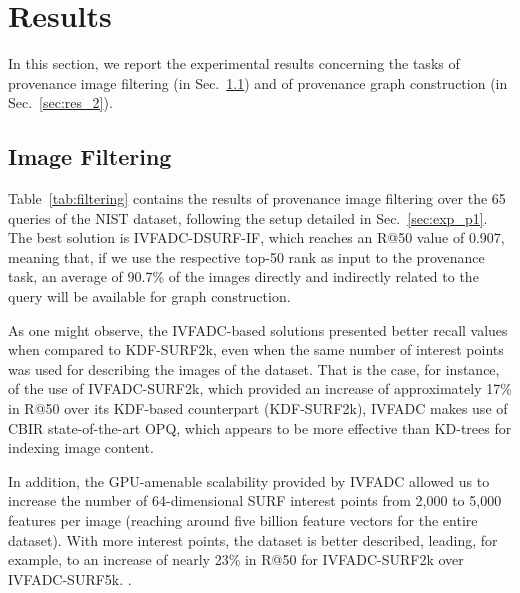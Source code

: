 
\section{Results}
\label{sec:results}
In this section, we report the experimental results concerning the tasks of provenance image filtering (in Sec.~\ref{sec:res_1}) and of provenance graph construction (in Sec.~\ref{sec:res_2}).

\subsection{Image Filtering}
\label{sec:res_1}
Table~\ref{tab:filtering} contains the results of provenance image filtering over the 65 queries of the NIST dataset, following the setup detailed in Sec.~\ref{sec:exp_p1}.
The best solution is IVFADC-DSURF-IF, which reaches an R@50 value of 0.907, meaning that, if we use the respective top-50 rank as input to the provenance task, an average of 90.7\% of the images directly and indirectly related to the query will be available for graph construction.

As one might observe, the IVFADC-based solutions presented better recall values when compared to KDF-SURF2k, even when the same number of interest points was used for describing the images of the dataset.
That is the case, for instance, of the use of IVFADC-SURF2k, which provided an increase of approximately 17\% in R@50 over its KDF-based counterpart (KDF-SURF2k), 
IVFADC makes use of CBIR state-of-the-art OPQ, which appears to be more effective than KD-trees for indexing image content.

In addition, the GPU-amenable scalability provided by IVFADC allowed us to increase the number of 64-dimensional SURF interest points from 2,000 to 5,000 features per image (reaching around five billion feature vectors for the entire dataset).
With more interest points, the dataset is better described, leading, for example, to an increase of nearly 23\% in R@50 for IVFADC-SURF2k over IVFADC-SURF5k.
.

